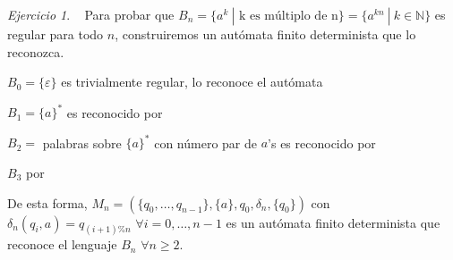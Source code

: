 \documentclass[12pt,spanish]{article}
\theoremstyle{definition}
\theoremstyle{remark}
\newtheorem{exercise}{Ejercicio}%
\begin{document}
\begin{exercise}~ Para probar que
  $B_n=\{a^k \ | \text{ k es múltiplo de n}\}=\{a^{kn} \ | \ k \in
  \mathbb{N}\}$ es regular para todo $n$, construiremos un autómata
  finito determinista que lo reconozca.

  $B_0=\{\varepsilon\}$ es trivialmente regular, lo reconoce el autómata \vspace{-5mm}
\begin{figure}[H]
  \centering
\end{figure} \vspace{-5mm}
$B_1=\{a\}^*$ es reconocido por \vspace{-7mm}
\begin{figure}[H]
  \centering
\end{figure}
$B_2=$ palabras sobre $\{a\}^*$ con número par de $a$'s es reconocido por
\begin{figure}[H]
  \centering
\end{figure}

$B_3$ por 
\begin{figure}[H]
  \centering
\end{figure}

De esta forma,
$M_n=(\{q_0,\ldots,q_{n-1}\},\{a\},q_0,\delta_n,\{q_0\})$ con
\\ $\delta_n(q_i,a)=q_{(i+1)\%n}$ $\forall i=0,\ldots,n-1$ es un
autómata finito determinista que reconoce el lenguaje $B_n$
$\forall n\geq 2$.
\end{exercise}
\end{document}

